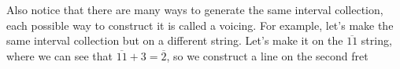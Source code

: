 \documentclass[preview]{standalone}
\begin{document}
\begin{center}
Also notice that there are many ways to generate the same interval collection, each possible way to construct it is called a voicing. For example, let's make the same interval collection but on a different string. Let's make it on the $\overline{11}$ string, where we can see that $\overline{11} + 3 = \overline{2}$, so we construct a line on the second fret
\end{center}
\end{document}
